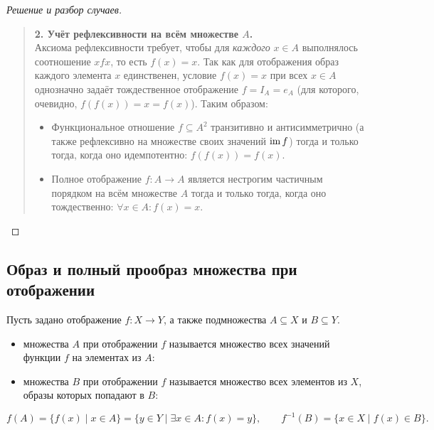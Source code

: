 \begin{proof}[Решение и разбор случаев]
\begin{quote}
        \textbf{2. Учёт рефлексивности на всём множестве $A$.}\\
        Аксиома рефлексивности требует, чтобы для \emph{каждого} $x \in A$ 
        выполнялось соотношение $x f x$, то есть $f(x) = x$. Так как для 
        отображения образ каждого элемента $x$ единственен, условие 
        $f(x) = x$ при всех $x \in A$ однозначно задаёт тождественное 
        отображение $f = I_A = e_A$ (для которого, очевидно, 
        $f(f(x)) = x = f(x)$). Таким образом:
        \begin{itemize}
            \item Функциональное отношение $f \subseteq A^2$ транзитивно и 
            антисимметрично (а также рефлексивно на множестве своих 
            значений $\operatorname{im} f$) тогда и только тогда, когда оно идемпотентно: 
            $f(f(x)) = f(x)$.
            \item Полное отображение $f: A \to A$ является нестрогим 
            частичным порядком на всём множестве $A$ тогда и только тогда, 
            когда оно тождественно: $\forall x \in A : f(x) = x$.
        \end{itemize}
    \end{quote}
\end{proof}

\subsection{Образ и полный прообраз множества при отображении}

\begin{definition}
    Пусть задано отображение $f: X \to Y$, а также подмножества 
    $A \subseteq X$ и $B \subseteq Y$.
    \begin{itemize}
        \item {} множества $A$ при 
        отображении $f$ называется множество всех значений функции $f$ на 
        элементах из $A$:
        \item {} множества $B$ при отображении $f$ 
        называется множество всех элементов из $X$, образы которых попадают 
        в $B$:
    \end{itemize}
    \begin{equation} \label{eq:im_preim_def}
        f(A) = \{f(x) \mid x \in A\} = \{y \in Y \mid \exists x \in A : f(x) = y\},
        \qquad
        f^{-1}(B) = \{x \in X \mid f(x) \in B\}. \tag{4}
    \end{equation}
\end{definition}

